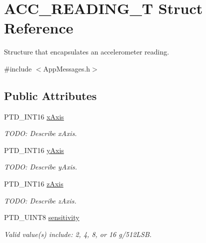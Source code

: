 \hypertarget{struct_a_c_c___r_e_a_d_i_n_g___t}{}\section{A\+C\+C\+\_\+\+R\+E\+A\+D\+I\+N\+G\+\_\+\+T Struct Reference}
\label{struct_a_c_c___r_e_a_d_i_n_g___t}


Structure that encapsulates an accelerometer reading.  




{\ttfamily \#include $<$App\+Messages.\+h$>$}

\subsection*{Public Attributes}
\begin{DoxyCompactItemize}
\item 
\hypertarget{struct_a_c_c___r_e_a_d_i_n_g___t_afd4a389ac161d7dd67a0f5955368df39}{}P\+T\+D\+\_\+\+I\+N\+T16 \hyperlink{struct_a_c_c___r_e_a_d_i_n_g___t_afd4a389ac161d7dd67a0f5955368df39}{x\+Axis}\label{struct_a_c_c___r_e_a_d_i_n_g___t_afd4a389ac161d7dd67a0f5955368df39}

\begin{DoxyCompactList}\small\item\em T\+O\+D\+O\+: Describe x\+Axis. \end{DoxyCompactList}\item 
\hypertarget{struct_a_c_c___r_e_a_d_i_n_g___t_ac816a3b3d0e12c83458c8a5b5dbfaf90}{}P\+T\+D\+\_\+\+I\+N\+T16 \hyperlink{struct_a_c_c___r_e_a_d_i_n_g___t_ac816a3b3d0e12c83458c8a5b5dbfaf90}{y\+Axis}\label{struct_a_c_c___r_e_a_d_i_n_g___t_ac816a3b3d0e12c83458c8a5b5dbfaf90}

\begin{DoxyCompactList}\small\item\em T\+O\+D\+O\+: Describe y\+Axis. \end{DoxyCompactList}\item 
\hypertarget{struct_a_c_c___r_e_a_d_i_n_g___t_ac7b2fe087dbbf046ce51893a032c662e}{}P\+T\+D\+\_\+\+I\+N\+T16 \hyperlink{struct_a_c_c___r_e_a_d_i_n_g___t_ac7b2fe087dbbf046ce51893a032c662e}{z\+Axis}\label{struct_a_c_c___r_e_a_d_i_n_g___t_ac7b2fe087dbbf046ce51893a032c662e}

\begin{DoxyCompactList}\small\item\em T\+O\+D\+O\+: Describe z\+Axis. \end{DoxyCompactList}\item 
\hypertarget{struct_a_c_c___r_e_a_d_i_n_g___t_a26626c8cd8cbebee04c55efb32ac357e}{}P\+T\+D\+\_\+\+U\+I\+N\+T8 \hyperlink{struct_a_c_c___r_e_a_d_i_n_g___t_a26626c8cd8cbebee04c55efb32ac357e}{sensitivity}\label{struct_a_c_c___r_e_a_d_i_n_g___t_a26626c8cd8cbebee04c55efb32ac357e}

\begin{DoxyCompactList}\small\item\em Valid value(s) include\+: 2, 4, 8, or 16 g/512\+L\+S\+B. \end{DoxyCompactList}\end{DoxyCompactItemize}


